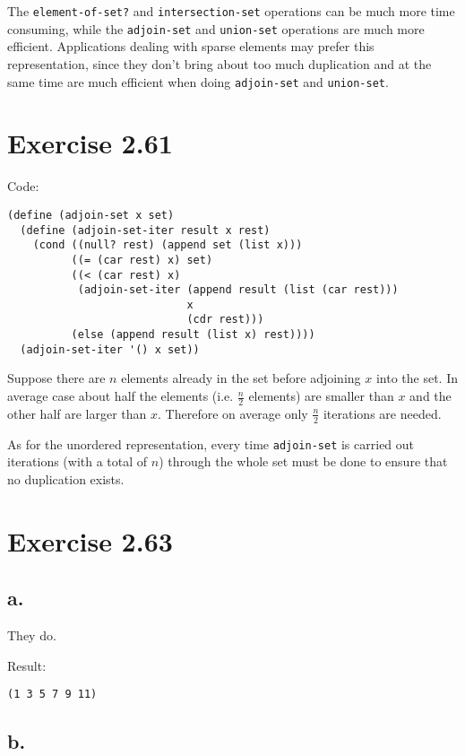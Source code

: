 \documentclass[../main.tex]{subfiles}
\begin{document}
The \lstinline{element-of-set?} and
 \lstinline{intersection-set} operations
 can be much more time consuming, while the
 \lstinline{adjoin-set} and \lstinline{union-set}
 operations are much more efficient.
 Applications dealing with sparse elements
 may prefer this representation, since they
 don't bring about too much duplication and
 at the same time are much efficient when
 doing \lstinline{adjoin-set} and \lstinline{union-set}.

\section{Exercise 2.61}

Code:

\begin{lstlisting}
(define (adjoin-set x set)
  (define (adjoin-set-iter result x rest)
    (cond ((null? rest) (append set (list x)))
          ((= (car rest) x) set)
          ((< (car rest) x)
           (adjoin-set-iter (append result (list (car rest)))
                            x
                            (cdr rest)))
          (else (append result (list x) rest))))
  (adjoin-set-iter '() x set))
\end{lstlisting}

Suppose there are $n$ elements already in the set
 before adjoining $x$ into the set. In average case
 about half the elements (i.e. $\frac{n}{2}$ elements)
 are smaller than $x$ and the other half are larger
 than $x$. Therefore on average only $\frac{n}{2}$
 iterations are needed.

As for the unordered representation, every time
 \lstinline{adjoin-set} is carried out iterations
 (with a total of $n$)
 through the whole set must be done to ensure
 that no duplication exists.

\section{Exercise 2.63}

\subsection{a.}

They do.

Result:

\begin{lstlisting}
(1 3 5 7 9 11)
\end{lstlisting}

\subsection{b.}
\end{document}
